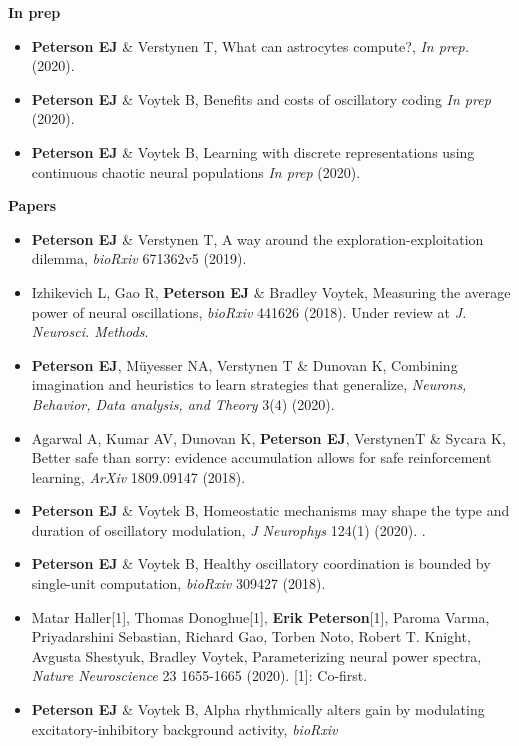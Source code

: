 \textbf{In prep}

\begin{itemize}
\item
  \textbf{Peterson EJ} \& Verstynen T, What can astrocytes compute?,
  \emph{In prep.} (2020).
\item
  \textbf{Peterson EJ} \& Voytek B, Benefits and costs of oscillatory
  coding \emph{In prep} (2020).
\item
  \textbf{Peterson EJ} \& Voytek B, Learning with discrete
  representations using continuous chaotic neural populations \emph{In
  prep} (2020).
\end{itemize}

\textbf{Papers}

\begin{itemize}
\item
  \textbf{Peterson EJ} \& Verstynen T, A way around the
  exploration-exploitation dilemma, \emph{bioRxiv} 671362v5 (2019).
\item
  Izhikevich L, Gao R, \textbf{Peterson EJ} \& Bradley Voytek, Measuring
  the average power of neural oscillations, \emph{bioRxiv} 441626
  (2018). Under review at \emph{J. Neurosci. Methods}.
\item
  \textbf{Peterson EJ}, Müyesser NA, Verstynen T \& Dunovan K, Combining
  imagination and heuristics to learn strategies that generalize,
  \emph{Neurons, Behavior, Data analysis, and Theory} 3(4) (2020).
\item
  Agarwal A, Kumar AV, Dunovan K, \textbf{Peterson EJ}, VerstynenT \&
  Sycara K, Better safe than sorry: evidence accumulation allows for
  safe reinforcement learning, \emph{ArXiv} 1809.09147 (2018).
\item
  \textbf{Peterson EJ} \& Voytek B, Homeostatic mechanisms may shape the
  type and duration of oscillatory modulation, \emph{J Neurophys} 124(1)
  (2020). .
\item
  \textbf{Peterson EJ} \& Voytek B, Healthy oscillatory coordination is
  bounded by single-unit computation, \emph{bioRxiv} 309427 (2018).
\item
  Matar Haller{[}1{]}, Thomas Donoghue{[}1{]}, \textbf{Erik
  Peterson}{[}1{]}, Paroma Varma, Priyadarshini Sebastian, Richard Gao,
  Torben Noto, Robert T. Knight, Avgusta Shestyuk, Bradley Voytek,
  Parameterizing neural power spectra, \emph{Nature Neuroscience} 23
  1655-1665 (2020). {[}1{]}: Co-first.
\item
  \textbf{Peterson EJ} \& Voytek B, Alpha rhythmically alters gain by
  modulating excitatory-inhibitory background activity, \emph{bioRxiv}

\end{itemize}
